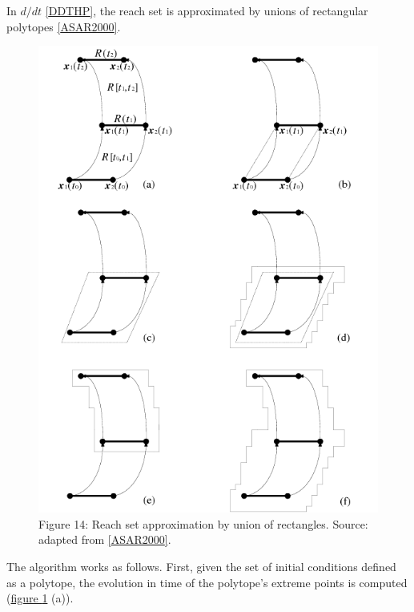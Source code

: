 \documentclass[letterpaper,10pt,english]{sphinxmanual}
\begin{document}
In \(d/dt\) {\hyperref[chap_intro:ddthp]{{[}DDTHP{]}}}, the reach set is approximated by
unions of rectangular polytopes {\hyperref[chap_intro:asar2000]{{[}ASAR2000{]}}}.
\begin{figure}[htbp]
\centering
\capstart

\includegraphics{chapter01_ddt.png}
\caption{Figure 14: Reach set approximation by union of rectangles. Source: adapted from {\hyperref[chap_intro:asar2000]{{[}ASAR2000{]}}}.}\label{chap_intro:ddtfig}\end{figure}

The algorithm works as follows. First, given the set of initial
conditions defined as a polytope, the evolution in time of the
polytope’s extreme points is computed (\hyperref[chap_intro:ddtfig]{figure  \ref*{chap_intro:ddtfig}} (a)).
\end{document}
